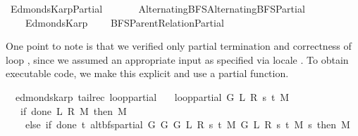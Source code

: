%
\begin{isabellebody}%
%
%
\isadelimdocument
%
\endisadelimdocument
%
\isatagdocument
%
\isamarkuptrue%
%
\endisatagdocument
{\isafolddocument}%
%
\isadelimdocument
%
\endisadelimdocument
%
\isadelimtheory
%
\endisadelimtheory
%
\isatagtheory
{}\isamarkupfalse%
\ Edmonds{\isacharunderscore}{\kern0pt}Karp{\isacharunderscore}{\kern0pt}Partial\isanewline
\ \ \isanewline
\ \ \ \ {\isachardoublequoteopen}{\isachardot}{\kern0pt}{\isachardot}{\kern0pt}{\isacharslash}{\kern0pt}Alternating{\isacharunderscore}{\kern0pt}BFS{\isacharslash}{\kern0pt}Alternating{\isacharunderscore}{\kern0pt}BFS{\isacharunderscore}{\kern0pt}Partial{\isachardoublequoteclose}\isanewline
\ \ \ \ Edmonds{\isacharunderscore}{\kern0pt}Karp\isanewline
\ \ \ \ {\isachardoublequoteopen}{\isachardot}{\kern0pt}{\isachardot}{\kern0pt}{\isacharslash}{\kern0pt}BFS{\isacharslash}{\kern0pt}Parent{\isacharunderscore}{\kern0pt}Relation{\isacharunderscore}{\kern0pt}Partial{\isachardoublequoteclose}\isanewline
{}%
\endisatagtheory
{\isafoldtheory}%
%
\isadelimtheory
%
\endisadelimtheory
%
\begin{isamarkuptext}%
One point to note is that we verified only partial termination and correctness of loop
, since we assumed an appropriate input as specified via locale
. To obtain executable code, we make this explicit and use a
partial function.%
\end{isamarkuptext}\isamarkuptrue%
\isamarkupfalse%
\ {\isacharparenleft}{\kern0pt}\ edmonds{\isacharunderscore}{\kern0pt}karp{\isacharparenright}{\kern0pt}\ {\isacharparenleft}{\kern0pt}tailrec{\isacharparenright}{\kern0pt}\ loop{\isacharprime}{\kern0pt}{\isacharunderscore}{\kern0pt}partial\ \isanewline
\ \ {\isachardoublequoteopen}loop{\isacharprime}{\kern0pt}{\isacharunderscore}{\kern0pt}partial\ G\ L\ R\ s\ t\ M\ {\isacharequal}{\kern0pt}\isanewline
\ \ \ {\isacharparenleft}{\kern0pt}if\ done{\isacharunderscore}{\kern0pt}{}\ L\ R\ M\ then\ M\isanewline
\ \ \ \ else\ if\ done{\isacharunderscore}{\kern0pt}{}\ t\ {\isacharparenleft}{\kern0pt}alt{\isacharunderscore}{\kern0pt}bfs{\isacharunderscore}{\kern0pt}partial\ {\isacharparenleft}{\kern0pt}G{}\ G\ {\isacharparenleft}{\kern0pt}G{}\ L\ R\ s\ t\ M{\isacharparenright}{\kern0pt}{\isacharparenright}{\kern0pt}\ {\isacharparenleft}{\kern0pt}G{}\ L\ R\ s\ t\ M{\isacharparenright}{\kern0pt}\ s{\isacharparenright}{\kern0pt}\ then\ M\isanewline

\end{isabellebody}

